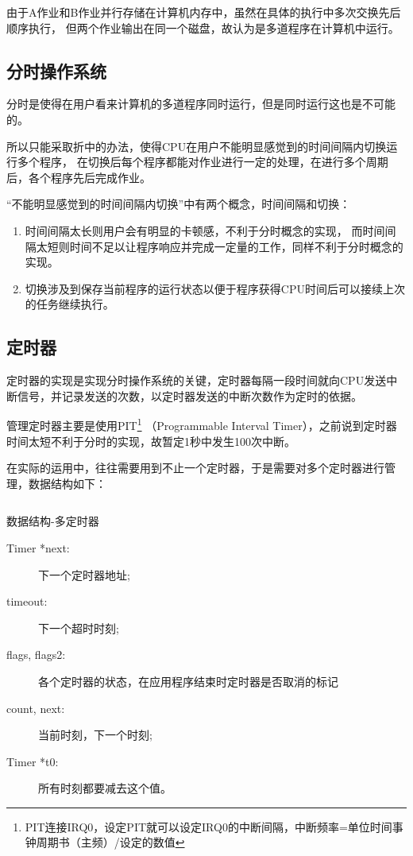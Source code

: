 由于A作业和B作业并行存储在计算机内存中，虽然在具体的执行中多次交换先后顺序执行，
但两个作业输出在同一个磁盘，故认为是多道程序在计算机中运行。

\subsection{分时操作系统}

分时是使得在用户看来计算机的多道程序同时运行，但是同时运行这也是不可能的。

所以只能采取折中的办法，使得CPU在用户不能明显感觉到的时间间隔内切换运行多个程序，
在切换后每个程序都能对作业进行一定的处理，在进行多个周期后，各个程序先后完成作业。

“不能明显感觉到的时间间隔内切换”中有两个概念，时间间隔和切换：

\begin{enumerate}
\item 时间间隔太长则用户会有明显的卡顿感，不利于分时概念的实现，
  而时间间隔太短则时间不足以让程序响应并完成一定量的工作，同样不利于分时概念的实现。
\item 切换涉及到保存当前程序的运行状态以便于程序获得CPU时间后可以接续上次的任务继续执行。
\end{enumerate}

\subsection{定时器}

定时器的实现是实现分时操作系统的关键，定时器每隔一段时间就向CPU发送中断信号，并记录发送的次数，以定时器发送的中断次数作为定时的依据。

管理定时器主要是使用PIT\footnote{PIT连接IRQ0，设定PIT就可以设定IRQ0的中断间隔，中断频率=单位时间事钟周期书（主频）/设定的数值}
（Programmable Interval Timer），之前说到定时器时间太短不利于分时的实现，故暂定1秒中发生100次中断。

在实际的运用中，往往需要用到不止一个定时器，于是需要对多个定时器进行管理，数据结构如下：

\begin{listing}[H]
  \inputminted[tabsize=2, firstline=175, lastline=187,
  linenos=true]{c}{../ZOS/src/kernel/bootpack.h}
  \caption{数据结构-多定时器}
  \label{lst:multi_timer}
\end{listing}

\begin{description}
\item[Timer *next:]下一个定时器地址;
\item[timeout:]下一个超时时刻;
\item[flags, flags2:]各个定时器的状态，在应用程序结束时定时器是否取消的标记
\item[count, next:]当前时刻，下一个时刻;
\item[Timer *t0:]所有时刻都要减去这个值。
\end{description}

